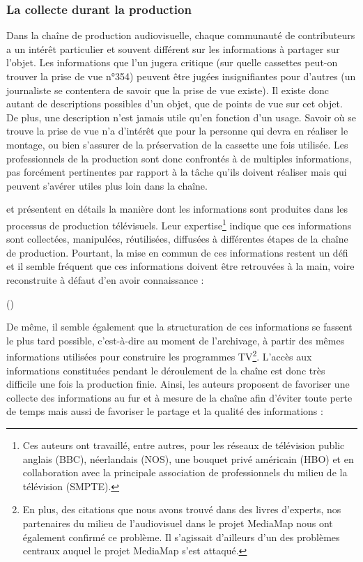 \subsubsection{La collecte durant la production}
Dans la chaîne de production audiovisuelle, chaque communauté de contributeurs a un intérêt particulier et souvent différent sur les informations à partager sur l'objet. 
Les informations que l'un jugera critique (sur quelle cassettes peut-on trouver la prise de vue n°354) peuvent être jugées insignifiantes pour d'autres (un journaliste se contentera de savoir que la prise de vue existe). 
Il existe donc autant de descriptions possibles d'un objet, que de points de vue sur cet objet. 
De plus, une description n'est jamais utile qu'en fonction d'un usage. 
Savoir où se trouve la prise de vue n'a d'intérêt que pour la personne qui devra en réaliser le montage, ou bien s'assurer de la préservation de la cassette une fois utilisée. 
Les professionnels de la production sont donc confrontés à de multiples informations, pas forcément pertinentes par rapport à la tâche qu'ils doivent réaliser mais qui peuvent s'avérer utiles plus loin dans la chaîne.  

\citeauthor{Rayers2002} et \cite{Austerberry2004} présentent en détails la manière dont les informations sont produites dans les processus de production télévisuels. 
Leur expertise\footnote{Ces auteurs ont travaillé, entre autres, pour les réseaux de télévision public anglais (BBC), néerlandais (NOS), une bouquet privé américain (HBO) et en collaboration avec la principale association de professionnels du milieu de la télévision (SMPTE).} indique que ces informations sont collectées, manipulées,  réutilisées, diffusées à différentes étapes de la chaîne de production. 
Pourtant, la mise en commun de ces informations restent un défi et il semble fréquent que ces informations doivent être retrouvées à la main, voire reconstruite à défaut d'en avoir connaissance :

 (\cite[p.22, Metadata in the Workflow]{Austerberry2004})

De même, il semble également que la structuration de ces informations se fassent le plus tard possible, c'est-à-dire au moment de l'archivage, à partir des mêmes informations utilisées pour construire les programmes TV\footnote{En plus, des citations que nous avons trouvé dans des livres d'experts, nos partenaires du milieu de l'audiovisuel dans le projet MediaMap nous ont également confirmé ce problème. Il s'agissait d'ailleurs d'un des problèmes centraux auquel le projet MediaMap s'est attaqué.}.
L'accès aux informations constituées pendant le déroulement de la chaîne est donc très difficile une fois la production finie.
Ainsi, les auteurs proposent de favoriser une collecte des informations au fur et à mesure de la chaîne afin d'éviter toute perte de temps mais aussi de favoriser le partage et la qualité des informations : 

